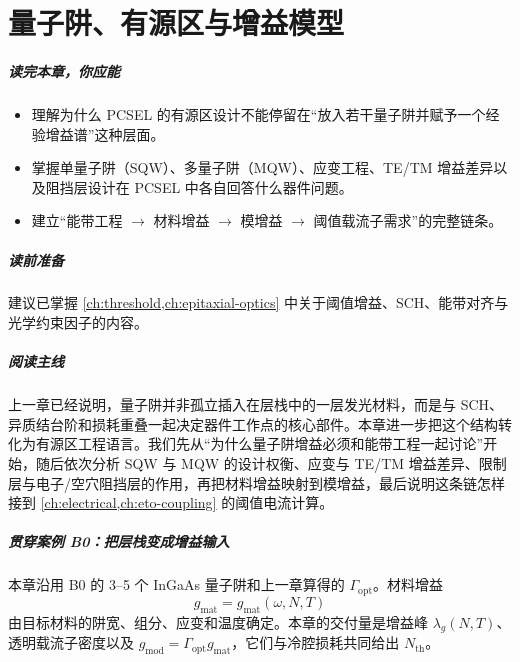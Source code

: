 ﻿%
\chapter{量子阱、有源区与增益模型}
\label{ch:qw-gain}

\paragraph{读完本章，你应能}
\begin{itemize}
  \item 理解为什么 PCSEL 的有源区设计不能停留在“放入若干量子阱并赋予一个经验增益谱”这种层面。
  \item 掌握单量子阱（SQW）、多量子阱（MQW）、应变工程、TE/TM 增益差异以及阻挡层设计在 PCSEL 中各自回答什么器件问题。
  \item 建立“能带工程 $\rightarrow$ 材料增益 $\rightarrow$ 模增益 $\rightarrow$ 阈值载流子需求”的完整链条。
\end{itemize}

\paragraph{读前准备}
建议已掌握 \cref{ch:threshold,ch:epitaxial-optics} 中关于阈值增益、SCH、能带对齐与光学约束因子的内容。

\paragraph{阅读主线}
上一章已经说明，量子阱并非孤立插入在层栈中的一层发光材料，而是与 SCH、异质结台阶和损耗重叠一起决定器件工作点的核心部件。本章进一步把这个结构转化为有源区工程语言。我们先从“为什么量子阱增益必须和能带工程一起讨论”开始，随后依次分析 SQW 与 MQW 的设计权衡、应变与 TE/TM 增益差异、限制层与电子/空穴阻挡层的作用，再把材料增益映射到模增益，最后说明这条链怎样接到 \cref{ch:electrical,ch:eto-coupling} 的阈值电流计算。

\paragraph{贯穿案例 B0：把层栈变成增益输入}
本章沿用 B0 的 3--5 个 InGaAs 量子阱和上一章算得的 $\Gamma_{\mathrm{opt}}$。材料增益
\[
g_{\mathrm{mat}}=g_{\mathrm{mat}}(\omega,N,T)
\]
由目标材料的阱宽、组分、应变和温度确定。本章的交付量是增益峰 $\lambda_g(N,T)$、透明载流子密度以及 $g_{\mathrm{mod}}=\Gamma_{\mathrm{opt}}g_{\mathrm{mat}}$，它们与冷腔损耗共同给出 $N_{\mathrm{th}}$。

